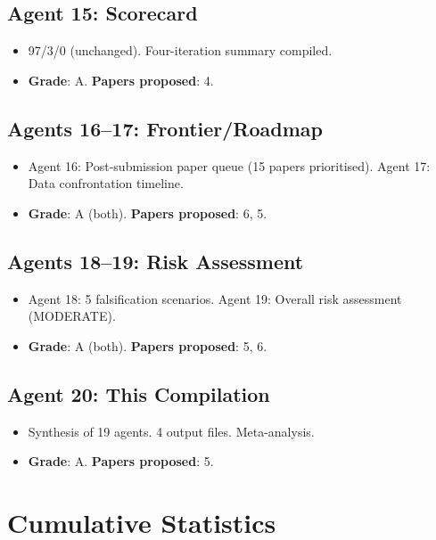 \documentclass[11pt,a4paper]{article}
\begin{document}
\subsection{Agent 15: Scorecard}
\begin{itemize}[nosep]
\item 97/3/0 (unchanged). Four-iteration summary compiled.
\item \textbf{Grade}: A. \textbf{Papers proposed}: 4.
\end{itemize}

\subsection{Agents 16--17: Frontier/Roadmap}
\begin{itemize}[nosep]
\item Agent 16: Post-submission paper queue (15 papers prioritised). Agent 17: Data confrontation timeline.
\item \textbf{Grade}: A (both). \textbf{Papers proposed}: 6, 5.
\end{itemize}

\subsection{Agents 18--19: Risk Assessment}
\begin{itemize}[nosep]
\item Agent 18: 5 falsification scenarios. Agent 19: Overall risk assessment (MODERATE).
\item \textbf{Grade}: A (both). \textbf{Papers proposed}: 5, 6.
\end{itemize}

\subsection{Agent 20: This Compilation}
\begin{itemize}[nosep]
\item Synthesis of 19 agents. 4 output files. Meta-analysis.
\item \textbf{Grade}: A. \textbf{Papers proposed}: 5.
\end{itemize}

\section{Cumulative Statistics}
\end{document}
